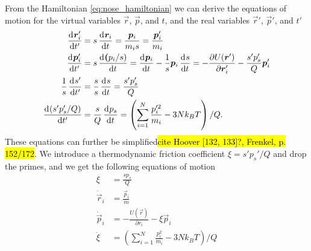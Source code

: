 From the Hamiltonian \cref{eq:nose_hamiltonian} we can derive the equations of motion for the virtual variables $\vec r$, $\vec p$, and $t$, and the real variables $\vec r'$, $\vec p'$, and $t'$ \cite{hoover1985canonical}
\begin{align*}
    \dod{\vec r_i'}{t'}     &= s\dod{\vec r_i}{t} = \frac{\vec p_i}{m_is} = \frac{\vec p_i'}{m_i} \\
    \dod{\vec p_i'}{t'}     &= s\dod{\vec (p_i/s)}{t} = \dod{\vec p_i}{t} - \frac{1}{s}\vec p_i\dod{s}{t} = -\frac{\partial U(\vec r')}{\partial \vec r_i'} - \frac{s'p_s'}{Q}\vec p_i' \\
    \frac{1}{s}\dod{s'}{t'} &= \frac{s}{s}\dod{s}{t} = \frac{s'p_s'}{Q} \\
    \dod{(s'p_s'/Q)}{t'}    &= \frac{s}{Q}\dod{p_s}{t} = \left( \sum_{i=1}^N \frac{p_i'^2}{m_i} - 3Nk_BT\right) / Q.
\end{align*}
These equations can further be simplified\hl{cite Hoover [132, 133]?, Frenkel, p. 152/172}. We introduce a thermodynamic friction coefficient $\xi = s'p_s'/Q$ and drop the primes, and we get the following equations of motion
\begin{align}
    \xi             &= \frac{sp_s}{Q} \label{eq:nose_xi}\\
    \dot{\vec r}_i  &= \frac{\vec p_i}{m} \label{eq:nose_position}\\
    \dot{\vec p}_i  &= -\frac{U(\vec r)}{\partial r_i} - \xi \vec p_i \label{eq:nose_momentum}\\
    \dot\xi         &= \left( \sum_{i=1}^N \frac{p_i^2}{m_i} - 3Nk_BT \right) / Q \label{eq:nose_dotxi}%
\end{align}

